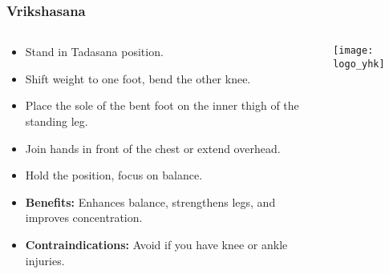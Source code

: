 \begin{frame}[fragile]\frametitle{Vrikshasana}
\begin{columns}
    \begin{column}[T]{0.5\linewidth}
      \begin{itemize}
        \item Stand in Tadasana position.
        \item Shift weight to one foot, bend the other knee.
        \item Place the sole of the bent foot on the inner thigh of the standing leg.
        \item Join hands in front of the chest or extend overhead.
        \item Hold the position, focus on balance.
        \item \textbf{Benefits:} Enhances balance, strengthens legs, and improves concentration.
        \item \textbf{Contraindications:} Avoid if you have knee or ankle injuries.
      \end{itemize}
    \end{column}
    \begin{column}[T]{0.5\linewidth}
        \begin{center}
        \texttt{[image: logo\_yhk]}
        \end{center}    
    \end{column}
  \end{columns}
\end{frame}

